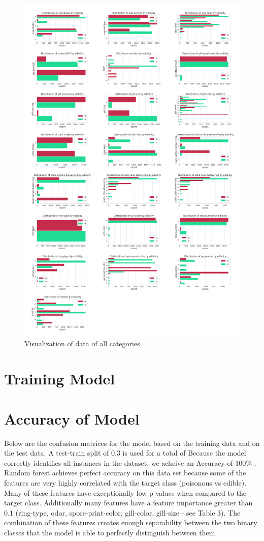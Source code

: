 \documentclass[]{article}
\begin{document}
\begin{figure}[!htb]
	\centering
	\includegraphics[scale=0.116]{visualize.jpeg}
	\caption{Visualization of data of all categories}
	\label{fig}
\end{figure}


\section{Training Model}

\section{Accuracy of Model}
Below are the confusion matrices for the model based on the training data and on the test data. A test-train split of $0.3$ is used for a total of  Because the model correctly identifies all instances in the dataset, we acheive an Accuracy of $100\%$ .
Random forest achieves perfect accuracy on this data set because some of the features are very highly correlated with the target class (poisonous vs edible). Many of these features have exceptionally low p-values when compared to the target class. Additionally many features have a feature importance greater than $0.1$ (ring-type, odor, spore-print-color, gill-color, gill-size - see Table 3). The combination of these features creates enough separability between the two binary classes that the model is able to perfectly distinguish between them. 
\end{document}
